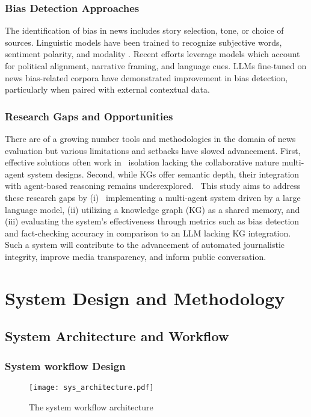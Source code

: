 \documentclass[11pt]{article}
\begin{document}
\subsubsection{Bias Detection Approaches}
The identification of bias in news includes story selection, tone, or choice of sources. Linguistic models have been trained to recognize subjective words, sentiment polarity, and modality \cite{r31}. Recent efforts leverage models which account for political alignment, narrative framing, and language cues\cite{r32}. LLMs fine-tuned on news bias-related corpora have demonstrated improvement in bias detection, particularly when paired with external contextual data.


\subsubsection{Research Gaps and Opportunities}

There are of a growing number tools and methodologies in the domain of news evaluation but various limitations and setbacks have slowed advancement. First, effective solutions often work in  isolation lacking the collaborative nature multi-agent system designs. Second, while KGs offer semantic depth, their integration with agent-based reasoning remains underexplored.  This study aims to address these research gaps by (i)  implementing a multi-agent system driven by a large language model, (ii) utilizing a knowledge graph (KG) as a shared memory, and (iii) evaluating the system's effectiveness through metrics such as bias detection and fact-checking accuracy in comparison to an LLM lacking KG integration. Such a system will contribute to the advancement of automated journalistic integrity, improve media transparency, and inform public conversation.



\section{System Design and  Methodology}

\subsection{System Architecture and Workflow}
\subsubsection{System workflow Design}

\begin{figure}[h!]
\begin{center}
\texttt{[image: sys\_architecture.pdf]}
\end{center}
\caption{The system workflow architecture}
\label{setup}
\end{figure}
\end{document}

